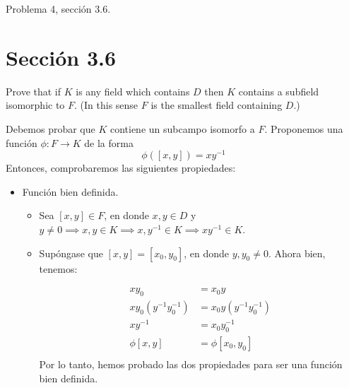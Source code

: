





Problema 4, sección 3.6.

\section*{Sección 3.6}
\begin{problema}[Problema 4]
    Prove that if $K$ is any field which contains $D$ then $K$ contains a subfield isomorphic to $F$. (In this sense $F$ is the smallest field containing $D$.)
    \begin{dem}
        Debemos probar que $K$ contiene un subcampo isomorfo a $F$. Proponemos una función $\phi: F\to K$ de la forma 
        $$\phi([x,y])=xy^{-1}$$
        Entonces, comprobaremos las siguientes propiedades: 
        \begin{itemize}
            \item Función bien definida. 
                \begin{itemize}
                    \item Sea $[x,y]\in F$, en donde $x,y\in D$ y $y\neq0\implies x,y\in K\implies x,y^{-1}\in K\implies xy^{-1}\in K$.
                    \item Supóngase que $[x,y]=[x_0,y_0]$, en donde $y,y_0\neq 0$. Ahora bien, tenemos:
                    
                    \begin{align*}
                               xy_0 &= x_0y\\
                               xy_0(y^{-1}y_0^{-1}) &= x_0y(y^{-1}y_0^{-1})\\
                               xy^{-1} &= x_0y_0^{-1}\\
                               \phi[x,y] &= \phi[x_0,y_0]\\
                    \end{align*}
                    Por lo tanto, hemos probado las dos propiedades para ser una función bien definida. 
                    

\end{itemize}
\end{itemize}
\end{dem}
\end{problema}

